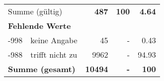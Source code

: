 \begin{longtable}{lXrrr}
     \midrule
     \multicolumn{2}{l}{Summe (gültig)} &
       \textbf{\num{487}} &
     \textbf{100} &
       \textbf{\num[round-mode=places,round-precision=2]{4,64}} \\
     \multicolumn{5}{l}{\textbf{Fehlende Werte}}\\
       -998 &
       keine Angabe &
         \num{45} &
        - &
         \num[round-mode=places,round-precision=2]{0,43} \\
       -988 &
       trifft nicht zu &
         \num{9962} &
        - &
         \num[round-mode=places,round-precision=2]{94,93} \\
     \midrule
     \multicolumn{2}{l}{\textbf{Summe (gesamt)}} &
          \textbf{\num{10494}} &
        \textbf{-} &
        \textbf{100} \\
     \bottomrule
     \end{longtable}
     
